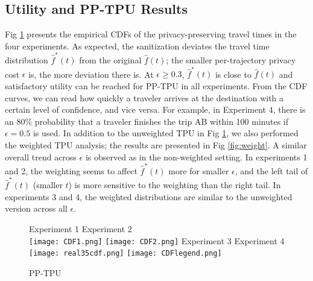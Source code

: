 \documentclass[10pt,journal,compsoc]{IEEEtran}
\begin{document}
\vspace{-16pt} \subsection{Utility and PP-TPU Results}\label{sec:utility}\vspace{-5pt}
Fig \ref{fig:CDF} presents the empirical CDFs of the privacy-preserving travel times in the four experiments.  As expected, the sanitization deviates the travel time distribution $\hat{f}^*(t)$ from the original $\hat{f}(t)$; the smaller per-trajectory privacy cost $\epsilon$ is, the more deviation there is. At $\epsilon\ge0.3$, $\hat{f}^*(t)$ is close to $\hat{f}(t)$ and satisfactory  utility can be reached for PP-TPU in all experiments.  From the CDF curves, we can read how quickly a traveler arrives at the destination with a certain level of confidence, and vice versa. For example, in Experiment 4, there is an 80\% probability that a traveler finishes the trip AB within 100 minutes if $\epsilon=0.5$ is used.  In addition to the unweighted TPU in Fig \ref{fig:CDF}, we also performed the weighted TPU analysis; the results are presented in Fig \ref{fig:weight}. A similar overall trend across $\epsilon$ is observed as in the non-weighted setting. In experiments 1 and 2, the weighting seems to affect $\hat{f}^*(t)$ more for smaller $\epsilon$, and the left tail of $\hat{f}^*(t)$ (smaller $t$) is more sensitive to the weighting than the right tail. In experiments 3 and 4, the weighted distributions are similar to the unweighted version across all $\epsilon$.
\begin{figure}[!htb]
\centering
\hspace{0.3in} Experiment 1 \hspace{0.8in} Experiment 2 \\
\texttt{[image: CDF1.png]}\hspace{-4pt}
\texttt{[image: CDF2.png]}\hspace{-4pt}
\hspace{0.3in} Experiment 3 \hspace{0.8in}  Experiment 4\\
\texttt{[image: real35cdf.png]}
\texttt{[image: CDFlegend.png]}
\vspace{-6pt}\caption{PP-TPU}\label{fig:CDF}\vspace{-9pt}
\end{figure}
\end{document}

